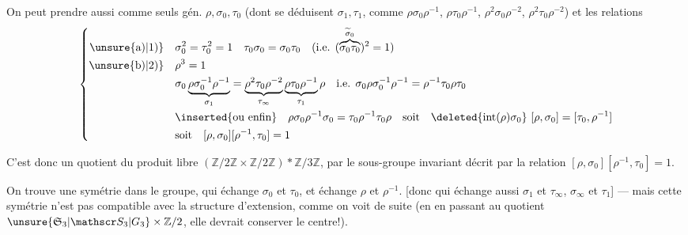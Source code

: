 On peut prendre aussi comme seuls gén. $\rho,\sigma_0,\tau_0$ (dont se déduisent $\sigma_1,\tau_1$, \inserted{$\sigma_\infty,\tau_\infty$} comme $\rho\sigma_0\rho^{-1}$, $\rho\tau_0\rho^{-1}$, $\rho^2\sigma_0\rho^{-2}$, $\rho^2\tau_0\rho^{-2}$) et les relations
\[
\left\{\begin{aligned}
\unsure{\mathrm a)|1)}\quad&\sigma_0^2=\tau_0^2=1\quad\tau_0\sigma_0=\sigma_0\tau_0\quad(\text{i.e. }(\overbrace{\sigma_0\tau_0}^{\widetilde\sigma_0})^2=1)\\
\unsure{\mathrm b)|2)}\quad&\rho^3=1\\
&\sigma_0\underbrace{\rho\sigma_0^{-1}\rho^{-1}}_{\sigma_1}=\underbrace{\rho^2\tau_0\rho^{-2}}_{\tau_\infty}\underbrace{\rho\tau_0\rho^{-1}}_{\tau_1}\rho\quad\text{i.e. }\sigma_0\rho\sigma_0^{-1}\rho^{-1}=\rho^{-1}\tau_0\rho\tau_0\\
&\inserted{\text{ou enfin}}\quad\rho\sigma_0\rho^{-1}\sigma_0=\tau_0\rho^{-1}\tau_0\rho\quad\text{soit}\quad\deleted{\operatorname{int}(\rho)\sigma_0}\ [\rho,\sigma_0]=[\tau_0,\rho^{-1}]\\
&\text{soit}\quad[\rho,\sigma_0][\rho^{-1},\tau_0]=1
\end{aligned}\right.
\]

C'est donc un quotient du produit libre $(\mathbb Z/2\mathbb Z\times\mathbb Z/2\mathbb Z)*\mathbb Z/3\mathbb Z$, par le sous-groupe invariant décrit par la relation $[\rho,\sigma_0][\rho^{-1},\tau_0]=1$.

On trouve une symétrie dans le groupe, qui échange $\sigma_0$ et $\tau_0$, et échange $\rho$ et $\rho^{-1}$. [donc qui échange aussi $\sigma_1$ et $\tau_\infty$, $\sigma_\infty$ et $\tau_1$] --- mais cette symétrie n'est pas compatible avec la structure d'extension, comme on voit  de suite (en en passant au quotient $\unsure{\mathfrak S_3|\mathscr S_3|G_3}\times\mathbb Z/2$, elle devrait conserver le centre!).

